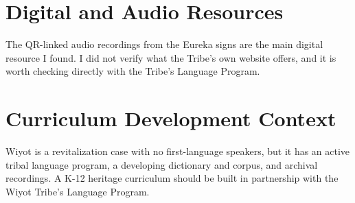 \documentclass[12pt]{article}
\begin{document}
\section{Digital and Audio Resources}
The QR-linked audio recordings from the Eureka signs are the main digital resource I found. I did not verify what the Tribe's own website offers, and it is worth checking directly with the Tribe's Language Program.

\section{Curriculum Development Context}
Wiyot is a revitalization case with no first-language speakers, but it has an active tribal language program, a developing dictionary and corpus, and archival recordings. A K-12 heritage curriculum should be built in partnership with the Wiyot Tribe's Language Program.
\end{document}
